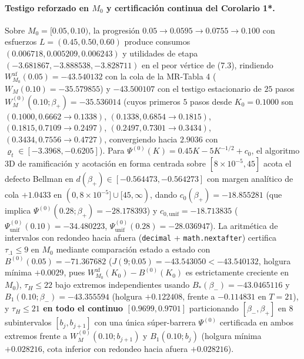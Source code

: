 \documentclass[11pt,letterpaper]{article}
\theoremstyle{plain}
\begin{document}
\paragraph{Testigo reforzado en $M_0$ y certificación continua del Corolario 1*.}
Sobre $M_0=[0.05,0.10)$, la progresión $0.05\to 0.0595\to 0.0755\to 0.100$ con esfuerzos $L=(0.45,0.50,0.60)$ produce consumos $(0.006718, 0.005209, 0.006243)$ y utilidades de etapa $(-3.681867, -3.888538, -3.828711)$ en el peor vértice de (7.3), rindiendo $W_{M_0}^{\mathrm{af}}(0.05) = -43.540132$ con la cola de la MR-Tabla 4 ($W_M(0.10)=-35.579855$) y $-43.500107$ con el testigo estacionario de $25$ pasos $W_M^{(0)}(0.10;\beta_+)=-35.536014$ (cuyos primeros $5$ pasos desde $K_0=0.1000$ son $(0.1000,0.6662\to 0.1338)$, $(0.1338,0.6854\to 0.1815)$, $(0.1815,0.7109\to 0.2497)$, $(0.2497,0.7301\to 0.3434)$, $(0.3434,0.7556\to 0.4727)$, convergiendo hacia $2.9036$ con $\varrho_t\in[-3.3968,-0.6205]$). Para $\Psi^{(0)}(K)=0.45K-5K^{-1/2}+c_0$, el algoritmo 3D de ramificación y acotación en forma centrada sobre $[8\times 10^{-5}, 45]$ acota el defecto Bellman en $d(\beta_+)\in[-0.564473, -0.564273]$ con margen analítico de cola $+1.0433$ en $(0,8\times 10^{-5}]\cup[45,\infty)$, dando $c_0(\beta_+)=-18.855281$ (que implica $\Psi^{(0)}(0.28;\beta_+)=-28.178393$) y $c_{0,\mathrm{unif}}=-18.713835$ ($\Psi^{(0)}_{\mathrm{unif}}(0.10)=-34.480223$, $\Psi^{(0)}_{\mathrm{unif}}(0.28)=-28.036947$). La aritmética de intervalos con redondeo hacia afuera (\texttt{decimal} + \texttt{math.nextafter}) certifica $\tau_{.1}\le 9$ en $M_0$ mediante comparación estado a estado con $B^{(0)}(0.05)=-71.367682$ ($J(9;0.05)=-43.543050 < -43.540132$, holgura mínima $+0.0029$, pues $W_{M_0}^{\mathrm{af}}(K_0)-B^{(0)}(K_0)$ es estrictamente creciente en $M_0$), $\tau_H\le 22$ bajo extremos independientes usando $B_*(\beta_-)=-43.0465116$ y $B_1(0.10;\beta_-)=-43.355594$ (holgura $+0.122408$, frente a $-0.114831$ en $T=21$), y \textbf{$\tau_H\le 21$ en todo el continuo $[0.9699,0.9701]$} particionando $[\beta_-,\beta_+]$ en $8$ subintervalos $[b_j, b_{j+1}]$ con una única súper-barrera $\Psi^{(0)}$ certificada en ambos extremos frente a $W_M^{(0)}(0.10; b_{j+1})$ y $B_1(0.10; b_j)$ (holgura mínima $+0.028216$, cota inferior con redondeo hacia afuera $+0.028216$).
\end{document}
